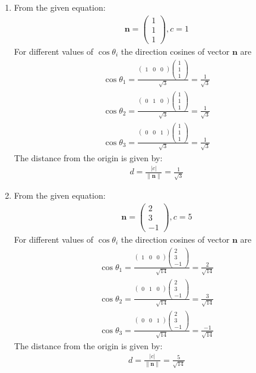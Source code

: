 \documentclass[12pt]{article}
\providecommand{\norm}[1]{\left\lVert#1\right\rVert}
\newcommand{\myvec}[1]{\ensuremath{\begin{pmatrix}#1\end{pmatrix}}}
\let\vec\mathbf
\begin{document}
\begin{enumerate}
\item From the given equation:
         \begin{align}
		\vec{n}=\myvec{1\\1\\1},c=1
			\end{align}
	 For different values of $\cos\theta_i$ the direction cosines of vector $\vec{n}$ are		
		\begin{align}
		\cos\theta_1=\frac{\myvec{1&0&0}\myvec{1 \\ 1\\1}}{\sqrt{3}}=\frac{1}{\sqrt{3}}\\
			\cos\theta_2=\frac{\myvec{0&1&0}\myvec{1 \\ 1\\1}}{\sqrt{3}}=\frac{1}{\sqrt{3}}\\
			\cos\theta_3=\frac{\myvec{0&0&1}\myvec{1\\1\\1}}{\sqrt{3}}=\frac{1}{\sqrt{3}}
		\end{align}
	The distance from the origin is given by:
		\begin{align}
			d=\frac{|c|}{\norm{\vec{n}}}=\frac{1}{\sqrt{3}}
		\end{align}

\item From the given equation:
         \begin{align}
		\vec{n}=\myvec{2\\3\\-1},c=5
			\end{align}
	For different values of $\cos\theta_i$ the direction cosines of vector $\vec{n}$ are
		\begin{align}
		\cos\theta_1=\frac{\myvec{1&0&0}\myvec{2 \\ 3\\-1}}{\sqrt{14}}=\frac{2}{\sqrt{14}}\\
			\cos\theta_2=\frac{\myvec{0&1&0}\myvec{2 \\ 3\\-1}}{\sqrt{14}}=\frac{3}{\sqrt{14}}\\
			\cos\theta_3=\frac{\myvec{0&0&1}\myvec{2\\3\\-1}}{\sqrt{14}}=\frac{-1}{\sqrt{14}}
		\end{align}
	The distance from the origin is given by:
		\begin{align}
			d=\frac{|c|}{\norm{\vec{n}}}=\frac{5}{\sqrt{14}}
		\end{align}
		

\end{enumerate}
\end{document}
